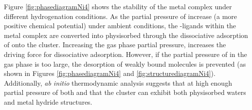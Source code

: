 \documentclass[journal=jctcce,manuscript=article]{achemso}
\begin{document}
Figure \ref{fig:phasediagramNi4} shows the stability of the  metal complex under different hydrogenation conditions. As the partial pressure of  increase (a more positive chemical potential) under ambient conditions, the -ligands within the  metal complex are converted into physisorbed  through the dissociative adsorption of  onto the cluster. Increasing the gas phase  partial pressure, increases the driving force for dissociative adsorption. However, if the partial pressure of  in the gas phase is too large, the desorption of weakly bound  molecules is prevented (as shown in Figures \ref{fig:phasediagramNi4} and \ref{fig:structurediagramNi4}). Additionally, \textit{ab initio} thermodynamic analysis suggests that at high enough partial pressure of both  and  that the cluster can exhibit both physisorbed waters and metal hydride structures.
 

\end{document}
